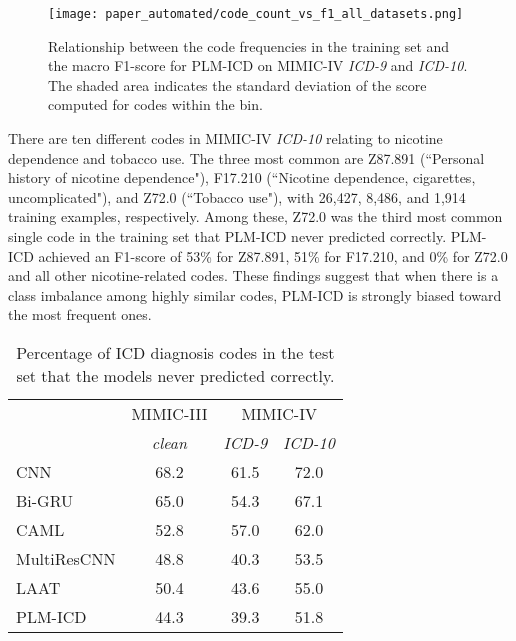 {\begin{figure}
    \centering
    \texttt{[image: paper\_automated/code\_count\_vs\_f1\_all\_datasets.png]}
    \caption[Relationship between code frequencies and macro F1-score for PLM-ICD on MIMIC-IV \textit{ICD-9} and \textit{ICD-10}.]{Relationship between the code frequencies in the training set and the macro F1-score for PLM-ICD on MIMIC-IV \textit{ICD-9} and \textit{ICD-10}. The shaded area indicates the standard deviation of the score computed for codes within the bin.}
    \label{fig:icd9_vs_icd10}
\end{figure}

There are ten different codes in MIMIC-IV \textit{ICD-10} relating to nicotine dependence and tobacco use. The three most common are Z87.891 (``Personal history of nicotine dependence"), F17.210 (``Nicotine dependence, cigarettes, uncomplicated"), and Z72.0 (``Tobacco use"), with 26,427, 8,486, and 1,914 training examples, respectively. Among these, Z72.0 was the third most common single code in the training set that PLM-ICD never predicted correctly. PLM-ICD achieved an F1-score of 53\% for Z87.891, 51\% for F17.210, and 0\% for Z72.0 and all other nicotine-related codes. These findings suggest that when there is a class imbalance among highly similar codes, PLM-ICD is strongly biased toward the most frequent ones.

 \begin{table}
    \centering
    \caption{Percentage of ICD diagnosis codes in the test set that the models never predicted correctly.}
    \label{tab:missed_classes}
    \begin{tabular}{lccc}
        \toprule
        & MIMIC-III & \multicolumn{2}{c}{MIMIC-IV}\\
        \cmidrule(lr){2-2}\cmidrule(lr){3-4}
        & \textit{clean} &  \textit{ICD-9} & \textit{ICD-10} \\
        \midrule
        CNN  & 68.2 & 61.5 & 72.0\\
        Bi-GRU  & 65.0 & 54.3 & 67.1\\
        CAML & 52.8 & 57.0 & 62.0  \\
        MultiResCNN  & 48.8 & 40.3 & 53.5 \\
        LAAT  & 50.4 & 43.6 & 55.0\\
        PLM-ICD   & 44.3 & 39.3 & 51.8\\
        \bottomrule
    \end{tabular}
\end{table}


}
